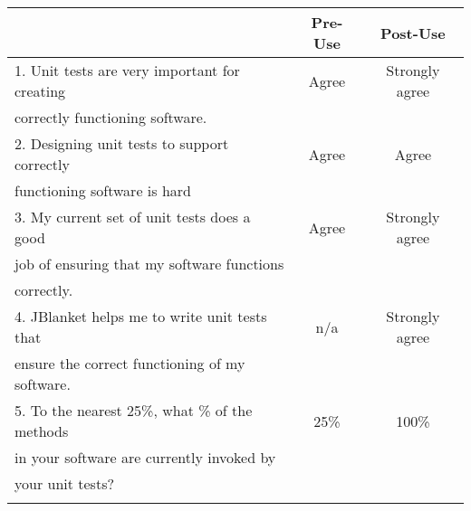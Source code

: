 \begin{tabular}{lcc} \\
 & {\bf Pre-Use} & {\bf Post-Use} \\ \hline
1. Unit tests are very important for creating & Agree & Strongly agree \\
   correctly functioning software. \\ \hline

2. Designing unit tests to support correctly & Agree & Agree \\
   functioning software is hard\\ \hline

3. My current set of unit tests does a good & Agree & Strongly agree \\
   job of ensuring that my software functions \\
   correctly.\\ \hline

4. JBlanket helps me to write unit tests that & n/a & Strongly agree \\
   ensure the correct functioning of my software.\\ \hline

5. To the nearest 25\%, what \% of the methods & 25\% & 100\% \\
   in your software are currently invoked by \\
   your unit tests?\\ \hline
\\
\end{tabular}

